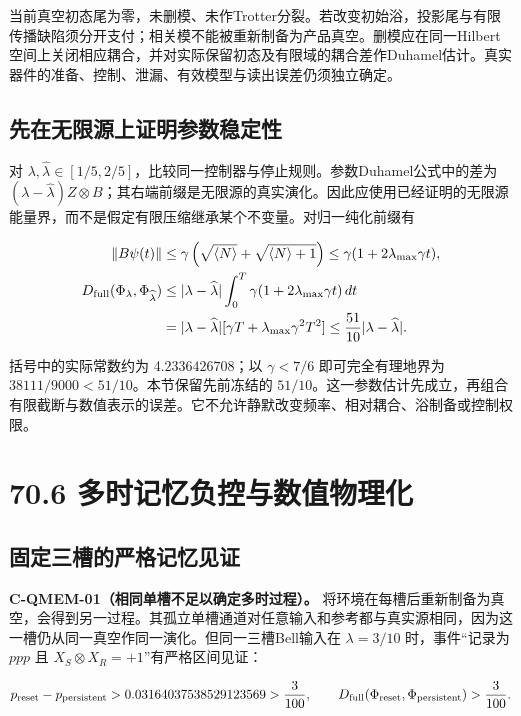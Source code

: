 \documentclass[
  11pt,
  oneside]{book}
\begin{document}
当前真空初态尾为零，未删模、未作Trotter分裂。若改变初始浴，投影尾与有限传播缺陷须分开支付；相关模不能被重新制备为产品真空。删模应在同一Hilbert空间上关闭相应耦合，并对实际保留初态及有限域的耦合差作Duhamel估计。真实器件的准备、控制、泄漏、有效模型与读出误差仍须独立确定。

\subsection{先在无限源上证明参数稳定性}

对
\(\lambda,\widehat\lambda\in[1/5,2/5]\)，比较同一控制器与停止规则。参数Duhamel公式中的差为
\((\lambda-\widehat\lambda)Z\otimes B\)；其右端前缀是无限源的真实演化。因此应使用已经证明的无限源能量界，而不是假定有限压缩继承某个不变量。对归一纯化前缀有

\[
\begin{aligned}
\|B\psi(t)\|&\le\gamma\left(\sqrt{\langle N\rangle}
+\sqrt{\langle N\rangle+1}\right)
\le\gamma(1+2\lambda_{\max}\gamma t),\\
D_{\rm full}(\Phi_\lambda,\Phi_{\widehat\lambda})
&\le|\lambda-\widehat\lambda|
\int_0^T\gamma(1+2\lambda_{\max}\gamma t)\,dt\\
&=|\lambda-\widehat\lambda|
[\gamma T+\lambda_{\max}\gamma^2T^2]
\le\frac{51}{10}|\lambda-\widehat\lambda|.
\end{aligned}
\]

括号中的实际常数约为 \(4.2336426708\)；以 \(\gamma<7/6\)
即可完全有理地界为 \(38111/9000<51/10\)。本节保留先前冻结的
\(51/10\)。这一参数估计先成立，再组合有限截断与数值表示的误差。它不允许静默改变频率、相对耦合、浴制备或控制权限。

\section{70.6 多时记忆负控与数值物理化}

\subsection{固定三槽的严格记忆见证}

\protect\hypertarget{c-qmem-01}{}{}
\textbf{C-QMEM-01（相同单槽不足以确定多时过程）。}
将环境在每槽后重新制备为真空，会得到另一过程。其孤立单槽通道对任意输入和参考都与真实源相同，因为这一槽仍从同一真空作同一演化。但同一三槽Bell输入在
\(\lambda=3/10\) 时，事件``记录为 \(ppp\) 且
\(X_S\otimes X_R=+1\)''有严格区间见证：

\[
p_{\rm reset}-p_{\rm persistent}
>0.03164037538529123569>\frac3{100},
\qquad
D_{\rm full}(\Phi_{\rm reset},\Phi_{\rm persistent})>\frac3{100}.
\]
\end{document}
